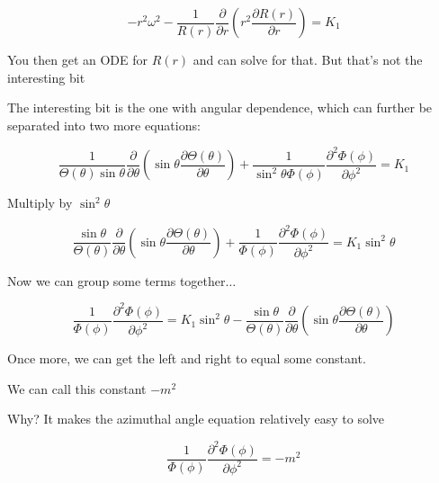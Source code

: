 \documentclass[12pt]{article}
\renewcommand{\_}{\kern-1.5pt\textunderscore\kern-1.5pt}
\begin{document}
 \[ -r^{2} \omega ^{2}-\frac{1}{R \left( r \right) }\frac{ \partial }{ \partial r} \left( r^{2}\frac{ \partial R \left( r \right) }{ \partial r} \right) =K_{1} \] \par

You then get an ODE for  \( R \left( r \right)  \)  and can solve for that. But that’s not the interesting bit\par

The interesting bit is the one with angular dependence, which can further be separated into two more equations:\par

 \[ \frac{1}{ \Theta  \left(  \theta  \right) \sin  \theta }\frac{ \partial }{ \partial  \theta } \left( \sin  \theta \frac{ \partial  \Theta  \left(  \theta  \right) }{ \partial  \theta } \right) +\frac{1}{\sin ^{2} \theta  \Phi  \left(  \phi  \right) }\frac{ \partial ^{2} \Phi  \left(  \phi  \right) }{ \partial  \phi ^{2}}=K_{1} \] \par

Multiply by  \( \sin ^{2} \theta  \) \par

 \[ \frac{\sin  \theta }{ \Theta  \left(  \theta  \right) }\frac{ \partial }{ \partial  \theta } \left( \sin  \theta \frac{ \partial  \Theta  \left(  \theta  \right) }{ \partial  \theta } \right) +\frac{1}{ \Phi  \left(  \phi  \right) }\frac{ \partial ^{2} \Phi  \left(  \phi  \right) }{ \partial  \phi ^{2}}=K_{1}\sin ^{2} \theta  \] \par

Now we can group some terms together$ \ldots $ \par

 \[ \frac{1}{ \Phi  \left(  \phi  \right) }\frac{ \partial ^{2} \Phi  \left(  \phi  \right) }{ \partial  \phi ^{2}}=K_{1}\sin ^{2} \theta -\frac{\sin  \theta }{ \Theta  \left(  \theta  \right) }\frac{ \partial }{ \partial  \theta } \left( \sin  \theta \frac{ \partial  \Theta  \left(  \theta  \right) }{ \partial  \theta } \right)  \] \par

Once more, we can get the left and right to equal some constant.\par

We can call this constant  \( -m^{2} \) \par

Why? It makes the azimuthal angle equation relatively easy to solve\par

 \[ \frac{1}{ \Phi  \left(  \phi  \right) }\frac{ \partial ^{2} \Phi  \left(  \phi  \right) }{ \partial  \phi ^{2}}=-m^{2} \] \par
\end{document}
